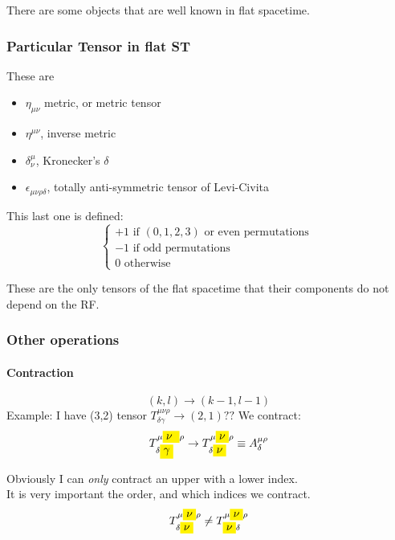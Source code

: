 There are some objects that are well known in flat spacetime.
\subsubsection{Particular Tensor in flat ST}
These are
\begin{itemize}
	\item $\eta_{\mu  \nu }$ metric, or metric tensor
	\item $\eta^{\mu \nu }$, inverse metric
	\item $\delta^{\mu }_{\nu }$, Kronecker's $\delta $
	\item $\epsilon_{\mu \nu \rho \delta }$, totally anti-symmetric tensor of Levi-Civita
\end{itemize}

This last one is defined:
\begin{equation}
\begin{cases}
+1 \text{ if } \left( 0,1,2,3 \right) \text{ or even permutations } \\
-1 \text{ if  odd permutations} \\
0 \text{ otherwise }
\end{cases}
\end{equation}

These are the only tensors of the flat spacetime that their components do not depend on the RF. \par

\subsubsection{Other operations}
\paragraph{Contraction} \[
	\left( k,l \right) \to \left( k-1, l-1 \right)
\]
Example: I have (3,2) tensor $T^{\mu \nu \rho }_{\delta \gamma } \to \left( 2,1 \right) ??$
We contract:
\[
	T^{\mu \colorbox{yellow}{$\nu$ } \rho  }_{\delta \colorbox{yellow}{$\gamma$} } \to T^{\mu  \colorbox{yellow}{$ \nu   $} \rho }_{\delta \colorbox{yellow}{$ \nu   $} } \equiv A^{\mu  \rho }_{\delta } 
\]

Obviously I can \emph{only} contract an upper with a lower index. \\
It is very important the order, and which indices we contract.
\[
T^{\mu  \colorbox{yellow}{$ \nu   $} \rho }_{\delta  \colorbox{yellow}{$ \nu   $} } \neq T^{\mu  \colorbox{yellow}{$ \nu   $} \rho }_{ \colorbox{yellow}{$ \nu   $} \delta  }
\]

